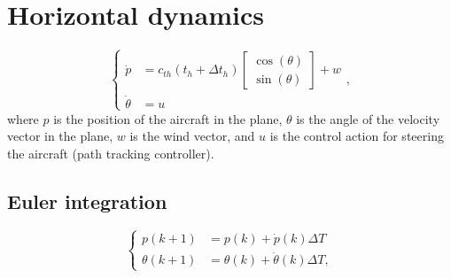\documentclass[11pt,a4paper,titlepage]{article}
\begin{document}
\section{Horizontal dynamics}
\begin{equation}
	\begin{cases}
		\dot p &= c_{th}(t_h + \Delta t_h) \begin{bmatrix}\cos(\theta) \\ \sin(\theta) \end{bmatrix} + w \\
			\dot\theta &= u
	\end{cases},
\end{equation}
where $p$ is the position of the aircraft in the plane, $\theta$ is the angle of the velocity vector in the plane, $w$ is the wind vector, and $u$ is the control action for steering the aircraft (path tracking controller).

\subsection{Euler integration}
\begin{equation}
	\begin{cases}
		p(k+1) &= p(k) + \dot p(k) \Delta T \\
		\theta(k+1) &= \theta(k) + \dot\theta(k) \Delta T,
	\end{cases}
\end{equation}
\end{document}
